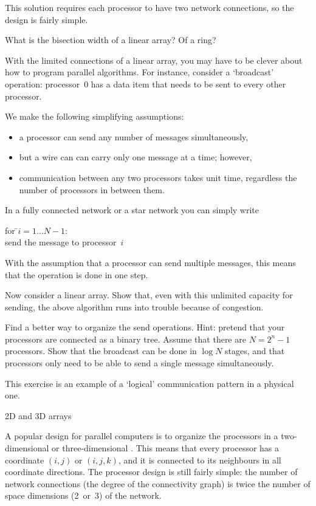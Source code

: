 This solution requires each processor to have two network connections,
so the design is fairly simple.

\begin{exercise}
  What is the bisection width of a linear array? Of a ring?
\end{exercise}

\begin{exercise}
  With the limited connections of a linear array, you may have to be
  clever about how to program parallel algorithms. For instance,
  consider a `broadcast' operation: processor~$0$ has a data item that
  needs to be sent to every other processor. 

  We make the following simplifying assumptions:
  \begin{itemize}
  \item a processor can send any number of messages simultaneously,
  \item but a wire can can carry only one message at a time; however,
    \item communication between any two processors takes unit time,
      regardless the number of processors in between them.
  \end{itemize}

  In a fully connected network or a star network
  you can simply write
  \begin{tabbing}
    for \=$i=1\ldots N-1$:\\ \>send the message to processor~$i$
  \end{tabbing}
  With the assumption that a processor can send multiple messages,
  this means that the operation is done in one step.

  Now consider a linear array. Show that, even with this unlimited capacity for
  sending, the above algorithm runs into trouble because of congestion.

  Find a better way to organize the send operations. Hint: pretend
  that your processors are connected as a binary tree. Assume that
  there are $N=2^n-1$ processors.
  Show that the broadcast can be done in $\log N$ stages, and that
  processors only need to be able to send a single message simultaneously.
\end{exercise}
This exercise is an example of  a
`logical' communication pattern in a physical one.

 {2D and 3D arrays}

A popular design for parallel computers is to organize the processors
in a two-dimensional or three-dimensional .
This means that every processor has a coordinate $(i,j)$ or $(i,j,k)$,
and it is connected to its neighbours in all coordinate directions.
The processor design is still fairly simple: the number of network
connections (the degree of the connectivity graph) is twice the number
of space dimensions (2~or~3) of the network.

